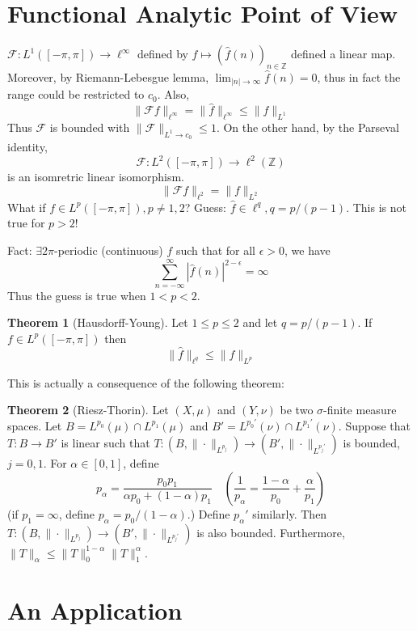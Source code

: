 \documentclass{article}
\theoremstyle{definition}
\newtheorem{thm}{Theorem}
\newcommand{\F}{\mathcal F}
\newcommand{\ZZ}{\mathbb Z}
\begin{document}
\section{Functional Analytic Point of View}

$\F: L^1([-\pi, \pi]) \to \ell^\infty$ defined by $f \mapsto (\widehat{f}(n))_{n \in \ZZ}$ defined a linear map.
Moreover, by Riemann-Lebesgue lemma, $\lim_{|n| \to \infty} \widehat{f}(n) = 0$, thus in fact the range could be restricted to $c_0$.
Also, 
\[
	\|\F f\|_{\ell^\infty} = \|\widehat{f}\|_{\ell^\infty} \leq \|f\|_{L^1}
\]
Thus $\F$ is bounded with $\|\F\|_{L^1 \to c_0} \leq 1$.
On the other hand, by the Parseval identity, 
\[
	\F: L^2([-\pi, \pi]) \to \ell^2(\ZZ)
\]
is an isomretric linear isomorphism.
\[
	\|\F f\|_{\ell^2} = \|f\|_{L^2}
\]
What if $f \in L^p([-\pi, \pi]), p \neq 1, 2$?
Guess: $\widehat{f} \in \ell^q, q = p/(p - 1)$.
This is not true for $p > 2$!

\par Fact: $\exists 2 \pi$-periodic (continuous) $f$ such that for all $\epsilon > 0$, we have
\[
	\sum_{n = -\infty}^\infty |\widehat{f}(n)|^{2 - \epsilon} = \infty
\]
Thus the guess is true when $1 < p < 2$.

\begin{thm}[Hausdorff-Young]
	Let $1 \leq p \leq 2$ and let $q = p/(p - 1)$.
	If $f \in L^p([-\pi, \pi])$ then 
	\[
		\|\hat{f}\|_{\ell^q} \leq \|f\|_{L^p}
	\]
\end{thm}

This is actually a consequence of the following theorem:

\begin{thm}[Riesz-Thorin]
	Let $(X, \mu)$ and $(Y, \nu)$ be two $\sigma$-finite measure spaces.
	Let $B = L^{p_0}(\mu) \cap L^{p_1}(\mu)$ and $B' = L^{p_0'}(\nu) \cap L^{p_1'}(\nu)$.
	Suppose that $T: B \to B'$ is linear such that $T: (B, \|\cdot\|_{L^{p_j}}) \to (B', \|\cdot\|_{L^{p_j'}})$ is bounded, $j = 0, 1$.
	For $\alpha \in [0, 1]$, define
	\[
		p_{\alpha} = \frac{p_0 p_1}{\alpha p_0 + (1 - \alpha) p_1} \quad \left( \frac{1}{p_\alpha} = \frac{1 - \alpha}{p_0} + \frac{\alpha}{p_1} \right)
	\]
	(if $p_1 = \infty$, define $p_\alpha = p_0/(1 - \alpha)$.) 
	Define $p_\alpha'$ similarly.
	Then $T: (B, \|\cdot\|_{L^{p_j}}) \to (B', \|\cdot\|_{L^{p_j'}})$ is also bounded.
	Furthermore, $\|T\|_{\alpha} \leq \|T\|_0^{1 - \alpha} \|T\|_1^{\alpha}$.
\end{thm}

\section{An Application}
\end{document}
